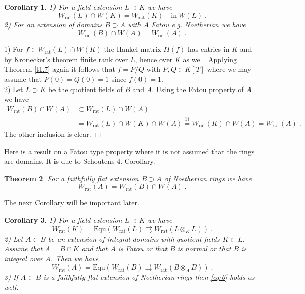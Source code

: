 \documentclass[12pt,leqno]{article}
\newcommand{\Equ}{\mathrm{Equ}}
\newcommand{\rat}{\mathrm{rat}}
\newtheorem{theorem}{Theorem}[section]
\newtheorem{cor}[theorem]{Corollary}
\newenvironment{proof}{\noindent {\bf Proof}}{\mbox{}\hspace*{\fill}$\Box$}
\begin{document}
\begin{cor}
\label{t1.8}
1) For a field extension $L \supset K$ we have
\[
W_{\rat} (L) \cap W (K) = W_{\rat} (K) \quad \text{in} \; W (L) \; .
\]
2) For an extension of domains $B \supset A$ with $A$ Fatou e.g. Noetherian we have
\[
W_{\rat} (B) \cap W (A) = W_{\rat} (A) \; .
\]
\end{cor}

\begin{proof}
1) For $f \in W_{\rat} (L) \cap W (K)$ the Hankel matrix $H (f)$ has entries in $K$ and by Kronecker's theorem finite rank over $L$, hence over $K$ as well. Applying Theorem \ref{t1.7} again it follows that $f = P / Q$ with $P, Q \in K [T]$ where we may assume that $P (0) = Q (0) = 1$ since $f (0) = 1$.\\
2) Let $L \supset K$ be the quotient fields of $B$ and $A$. Using the Fatou property of $A$ we have
\begin{align*}
W_{\rat} (B) \cap W (A) & \subset W_{\rat} (L) \cap W (A) \\
& = W_{\rat} (L) \cap W (K) \cap W (A) \overset{1)}{=} W_{\rat} (K) \cap W (A) = W_{\rat} (A) \; .
\end{align*}
The other inclusion is clear.
\end{proof}

Here is a result on a Fatou type property where it is not assumed that the rings are domains. It is due to Schoutens \cite{Sch} 4. Corollary. 

\begin{theorem}
\label{t1.9}
For a faithfully flat extension $B \supset A$ of Noetherian rings we have
\[
W_{\rat} (A) = W_{\rat} (B) \cap W (A) \; .
\]
\end{theorem}

The next Corollary will be important later.

\begin{cor}
\label{t1.10}
1) For a field extension $L \supset K$ we have
\begin{equation} \label{eq:5}
W_{\rat} (K) = \Equ (W_{\rat} (L) \rightrightarrows W_{\rat} (L \otimes_K L)) \; .
\end{equation}
2) Let $A \subset B$ be an extension of integral domains with quotient fields $K \subset L$. Assume that $A = B \cap K$ and that $A$ is Fatou or that $B$ is normal or that $B$ is integral over $A$. Then we have
\begin{equation} \label{eq:6}
W_{\rat} (A) = \Equ (W_{\rat} (B) \rightrightarrows W_{\rat} (B \otimes_A B)) \; .
\end{equation}
3) If $A \subset B$ is a faithfully flat extension of Noetherian rings then \eqref{eq:6} holds as well.
\end{cor}
\end{document}
